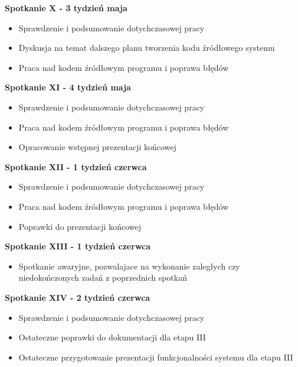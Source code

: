 \par{\textbf{Spotkanie X - 3 tydzień maja}}

\begin{itemize}
\item Sprawdzenie i podsumowanie dotychczasowej pracy
\item Dyskusja na temat dalszego planu tworzenia kodu źródłowego systemu
\item Praca nad kodem źródłowym programu i poprawa błędów
\end{itemize}

\par{\textbf{Spotkanie XI - 4 tydzień maja}}

\begin{itemize}
\item Sprawdzenie i podsumowanie dotychczasowej pracy
\item Praca nad kodem źródłowym programu i poprawa błędów
\item Opracowanie wstępnej prezentacji końcowej
\end{itemize}

\par{\textbf{Spotkanie XII - 1 tydzień czerwca}}

\begin{itemize}
\item Sprawdzenie i podsumowanie dotychczasowej pracy
\item Praca nad kodem źródłowym programu i poprawa błędów
\item Poprawki do prezentacji końcowej
\end{itemize}

\par{\textbf{Spotkanie XIII - 1 tydzień czerwca}}

\begin{itemize}
\item Spotkanie awaryjne, pozwalajace na wykonanie zaległych czy niedokończonych zadań z poprzednich spotkań
\end{itemize}

\par{\textbf{Spotkanie XIV - 2 tydzień czerwca}}

\begin{itemize}
\item Sprawdzenie i podsumowanie dotychczasowej pracy
\item Ostateczne poprawki do dokumentacji dla etapu III
\item Ostateczne przygotowanie prezentacji funkcjonalności systemu dla etapu III
\end{itemize}

